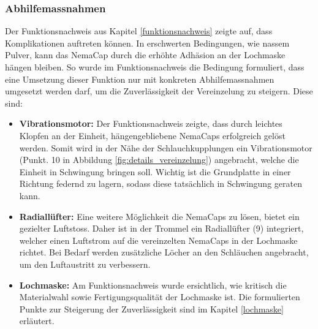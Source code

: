 \subsubsection{Abhilfemassnahmen}
\label{abhilfe}
Der Funktionsnachweis aus Kapitel \ref{funktionsnachweis} zeigte auf, dass Komplikationen auftreten können. In erschwerten Bedingungen, wie nassem Pulver, kann das NemaCap  durch die erhöhte Adhäsion an der Lochmaske hängen bleiben. So wurde im Funktionsnachweis die Bedingung formuliert, dass eine Umsetzung dieser Funktion nur mit konkreten Abhilfemassnahmen umgesetzt werden darf, um die Zuverlässigkeit der Vereinzelung zu steigern. Diese sind:
\begin{itemize}
	\item \textbf{Vibrationsmotor:} Der Funktionsnachweis zeigte, dass durch leichtes Klopfen an der Einheit, hängengebliebene NemaCaps erfolgreich gelöst werden. Somit wird in der Nähe der Schlauchkupplungen ein Vibrationsmotor (Punkt. 10 in Abbildung \ref{fig:details_vereinzelung}) angebracht, welche die Einheit in Schwingung bringen soll. Wichtig ist die Grundplatte in einer Richtung federnd zu lagern, sodass diese tatsächlich in Schwingung geraten kann.

	
	\item \textbf{Radiallüfter:} Eine weitere Möglichkeit die NemaCaps zu lösen, bietet ein gezielter Luftstoss. Daher ist in der Trommel ein Radiallüfter (9) integriert, welcher einen Luftstrom auf die vereinzelten NemaCaps in der Lochmaske richtet. Bei Bedarf werden zusätzliche Löcher an den Schläuchen angebracht, um den Luftaustritt zu verbessern. 
	
	\item \textbf{Lochmaske:} Am Funktionsnachweis wurde ersichtlich, wie kritisch die Materialwahl sowie Fertigungsqualität der Lochmaske ist. Die formulierten Punkte zur Steigerung der Zuverlässigkeit sind im Kapitel \ref{lochmaske} erläutert.
\end{itemize}

